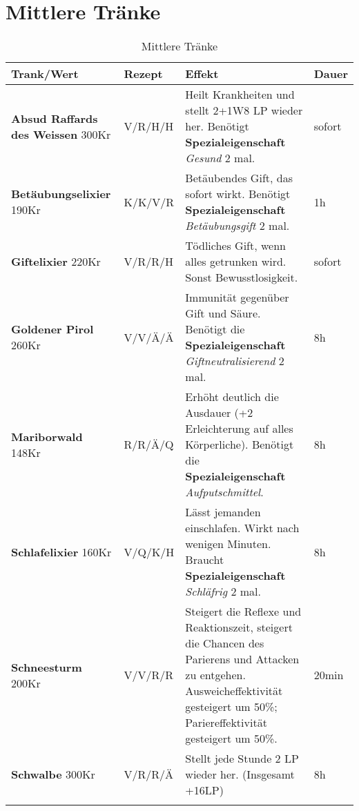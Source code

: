 \section{Mittlere Tränke}
\begin{longtable}{|p{3cm}|p{}|p{8cm}|p{}|}
\hline
\textbf{Trank/Wert} & \textbf{Rezept} & \textbf{Effekt} & \textbf{Dauer} \\ \hline

\textbf{Absud Raffards des Weissen} 300Kr & V/R/H/H & Heilt Krankheiten und stellt 2+1W8 LP wieder her. Benötigt \textbf{Spezialeigenschaft} \textit{Gesund} 2 mal. & sofort \\ \hline

\textbf{Betäubungselixier} 190Kr & K/K/V/R & Betäubendes Gift, das sofort wirkt. Benötigt \textbf{Spezialeigenschaft} \textit{Betäubungsgift} 2 mal. & 1h \\ \hline

\textbf{Giftelixier} 220Kr & V/R/R/H & Tödliches Gift, wenn alles getrunken wird. Sonst Bewusstlosigkeit. & sofort \\ \hline

\textbf{Goldener Pirol} 260Kr & V/V/Ä/Ä & Immunität gegenüber Gift und Säure. Benötigt die \textbf{Spezialeigenschaft} \textit{Giftneutralisierend} 2 mal. & 8h \\ \hline

\textbf{Mariborwald} 148Kr & R/R/Ä/Q & Erhöht deutlich die Ausdauer (+2 Erleichterung auf alles Körperliche). Benötigt die \textbf{Spezialeigenschaft} \textit{Aufputschmittel}. & 8h \\ \hline

\textbf{Schlafelixier} 160Kr & V/Q/K/H & Lässt jemanden einschlafen. Wirkt nach wenigen Minuten. Braucht \textbf{Spezialeigenschaft} \textit{Schläfrig} 2 mal. & 8h \\ \hline

\textbf{Schneesturm} 200Kr & V/V/R/R & Steigert die Reflexe und Reaktionszeit, steigert die Chancen des Parierens und Attacken zu entgehen. Ausweicheffektivität gesteigert um 50\%; Pariereffektivität gesteigert um 50\%. & 20min \\ \hline

\textbf{Schwalbe} 300Kr & V/R/R/Ä & Stellt jede Stunde 2 LP wieder her. (Insgesamt +16LP) & 8h \\ \hline

\caption{Mittlere Tränke}
\label{tab:mittlere_traenke}
\end{longtable}


